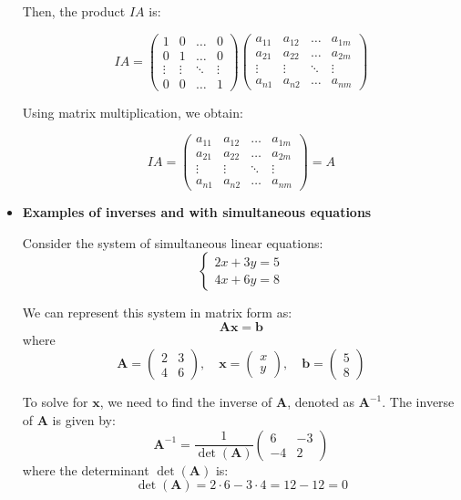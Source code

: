 \documentclass[a4paper,12pt]{article}
\begin{document}
\begin{itemize}[leftmargin=*]
Then, the product $IA$ is:

\[
IA = \begin{pmatrix} 1 & 0 & \dots & 0 \\ 0 & 1 & \dots & 0 \\ \vdots & \vdots & \ddots & \vdots \\ 0 & 0 & \dots & 1 \end{pmatrix} \begin{pmatrix} a_{11} & a_{12} & \dots & a_{1m} \\ a_{21} & a_{22} & \dots & a_{2m} \\ \vdots & \vdots & \ddots & \vdots \\ a_{n1} & a_{n2} & \dots & a_{nm} \end{pmatrix}
\]

Using matrix multiplication, we obtain:

\[
IA = \begin{pmatrix} a_{11} & a_{12} & \dots & a_{1m} \\ a_{21} & a_{22} & \dots & a_{2m} \\ \vdots & \vdots & \ddots & \vdots \\ a_{n1} & a_{n2} & \dots & a_{nm} \end{pmatrix} = A
\]

\item \textbf{Examples of inverses and with simultaneous equations}

Consider the system of simultaneous linear equations:
\[
\begin{cases}
2x + 3y = 5 \\
4x + 6y = 8
\end{cases}
\]

We can represent this system in matrix form as:
\[
\mathbf{A}\mathbf{x} = \mathbf{b}
\]
where
\[
\mathbf{A} = \begin{pmatrix}
2 & 3 \\
4 & 6
\end{pmatrix}, \quad
\mathbf{x} = \begin{pmatrix}
x \\
y
\end{pmatrix}, \quad
\mathbf{b} = \begin{pmatrix}
5 \\
8
\end{pmatrix}
\]

To solve for \( \mathbf{x} \), we need to find the inverse of \( \mathbf{A} \), denoted as \( \mathbf{A}^{-1} \). The inverse of \( \mathbf{A} \) is given by:
\[
\mathbf{A}^{-1} = \frac{1}{\det(\mathbf{A})} \begin{pmatrix}
6 & -3 \\
-4 & 2
\end{pmatrix}
\]
where the determinant \( \det(\mathbf{A}) \) is:
\[
\det(\mathbf{A}) = 2 \cdot 6 - 3 \cdot 4 = 12 - 12 = 0
\]


\end{itemize}
\end{document}
